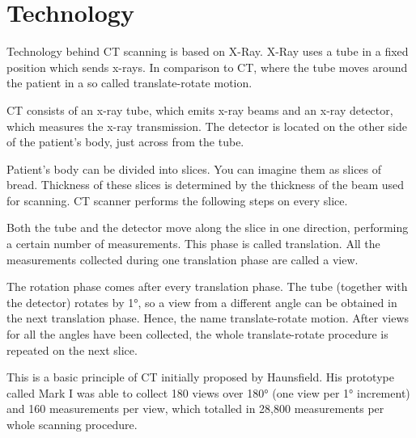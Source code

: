 \section{Technology}
Technology behind CT scanning is based on X-Ray. X-Ray uses a tube in a fixed position which sends x-rays. In comparison to CT, where the tube moves around the patient in a so called translate-rotate motion. 

CT consists of an x-ray tube, which emits x-ray beams and an x-ray detector, which measures the x-ray transmission. The detector is located on the other side of the patient's body, just across from the tube. 

Patient's body can be divided into slices. You can imagine them as slices of bread. Thickness of these slices is determined by the thickness of the beam used for scanning. CT scanner performs the following steps on every slice. 

Both the tube and the detector move along the slice in one direction, performing a certain number of measurements. This phase is called translation. All the measurements collected during one translation phase are called a view. 

The rotation phase comes after every translation phase. The tube (together with the detector) rotates by 1°, so a view from a different angle can be obtained in the next translation phase. Hence, the name translate-rotate motion. After views for all the angles have been collected, the whole translate-rotate procedure is repeated on the next slice.

This is a basic principle of CT initially proposed by Haunsfield. His prototype called Mark I was able to collect 180 views over 180° (one view per 1° increment) and 160 measurements per view, which totalled in 28,800 measurements per whole scanning procedure. \cite{goldman2007}







